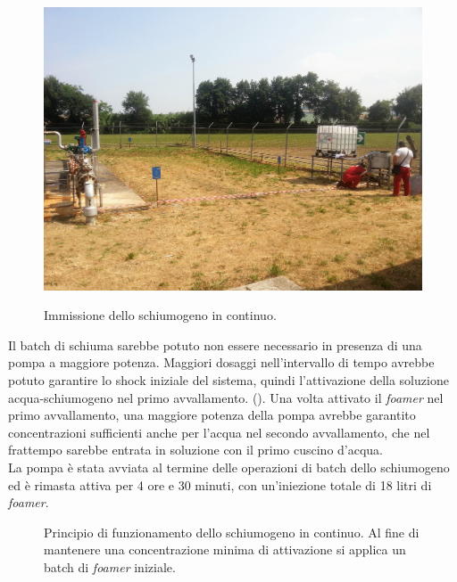 \begin{figure}[htbp]
    {\includegraphics[height=.27\textheight]{fig/test/continuo-2} \label{fig:test-continuo-linea}}
\caption{Immissione dello schiumogeno in continuo.}
\label{fig:test-continuo}
\end{figure}
Il batch di schiuma sarebbe potuto non essere necessario in presenza di una pompa a maggiore potenza. Maggiori dosaggi nell'intervallo di tempo avrebbe potuto garantire lo shock iniziale del sistema, quindi l'attivazione della soluzione acqua-schiumogeno nel primo avvallamento. (). Una volta attivato il \textit{foamer} nel primo avvallamento, una maggiore potenza della pompa avrebbe garantito concentrazioni sufficienti anche per l'acqua nel secondo avvallamento, che nel frattempo sarebbe entrata in soluzione con il primo cuscino d'acqua.\\
La pompa è stata avviata al termine delle operazioni di batch dello schiumogeno ed è rimasta attiva per 4 ore e 30 minuti, con un'iniezione totale di 18 litri di \textit{foamer}.

\begin{figure}[htbp]
    \centering
     \qquad
\caption{Principio di funzionamento dello schiumogeno in continuo. Al fine di mantenere una concentrazione minima di attivazione si applica un batch di \textit{foamer} iniziale.}
\label{fig:continuo-model}
\end{figure}

